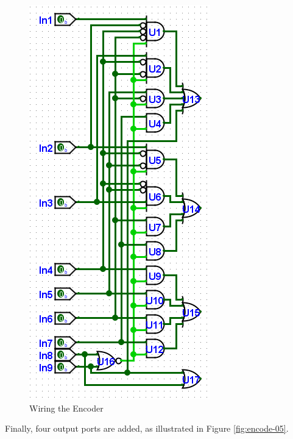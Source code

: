 \begin{figure}[H]
	\centering
	\includegraphics[width=\maxwidth{.95\linewidth}]{gfx/encode-04}
	\caption{Wiring the Encoder}
	\label{fig:encode-04}
\end{figure}

Finally, four output ports are added, as illustrated in Figure \ref{fig:encode-05}. 

